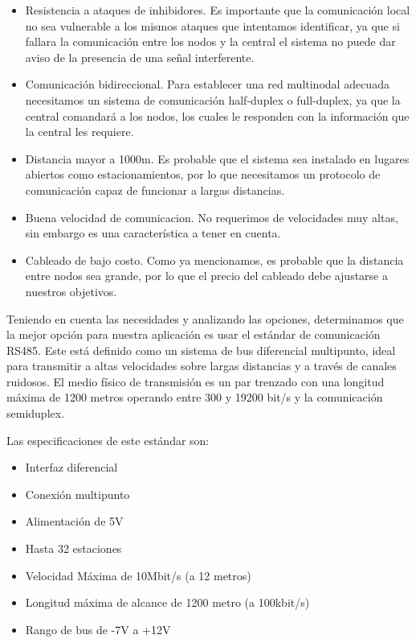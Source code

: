 \begin{itemize}
    \item Resistencia a ataques de inhibidores. Es importante que la comunicación local no sea vulnerable a los mismos ataques que intentamos identificar, ya que
    si fallara la comunicación entre los nodos y la central el sistema no puede dar aviso de la presencia de una señal interferente.
    \item Comunicación bidireccional. Para establecer una red multinodal adecuada necesitamos un sistema de comunicación half-duplex o full-duplex, ya que 
    la central comandará a los nodos, los cuales le responden con la información que la central les requiere.
    \item Distancia mayor a 1000m. Es probable que el sistema sea instalado en lugares abiertos como estacionamientos, por lo que necesitamos un protocolo de 
    comunicación capaz de funcionar a largas distancias.
    \item Buena velocidad de comunicacion. No requerimos de velocidades muy altas, sin embargo es una característica a tener en cuenta.
    \item Cableado de bajo costo. Como ya mencionamos, es probable que la distancia entre nodos sea grande, por lo que el precio del cableado debe ajustarse 
    a nuestros objetivos.

\end{itemize}

Teniendo en cuenta las necesidades y analizando las opciones, determinamos que la mejor opción para nuestra aplicación es usar el estándar de comunicación RS485. 
Este está definido como un sistema de bus diferencial multipunto, ideal para transmitir a altas velocidades sobre largas distancias y a través de canales ruidosos.
El medio físico de transmisión es un par trenzado con una longitud máxima de 1200 metros operando entre 300 y 19200 bit/s y la comunicación semiduplex.\par
Las especificaciones de este estándar son:

\begin{itemize}
    \item Interfaz diferencial
    \item Conexión multipunto
    \item Alimentación de 5V
    \item Hasta 32 estaciones 
    \item Velocidad Máxima de 10Mbit/s (a 12 metros)
    \item Longitud máxima de alcance de 1200 metro (a 100kbit/s)
    \item Rango de bus de -7V a +12V

\end{itemize}


